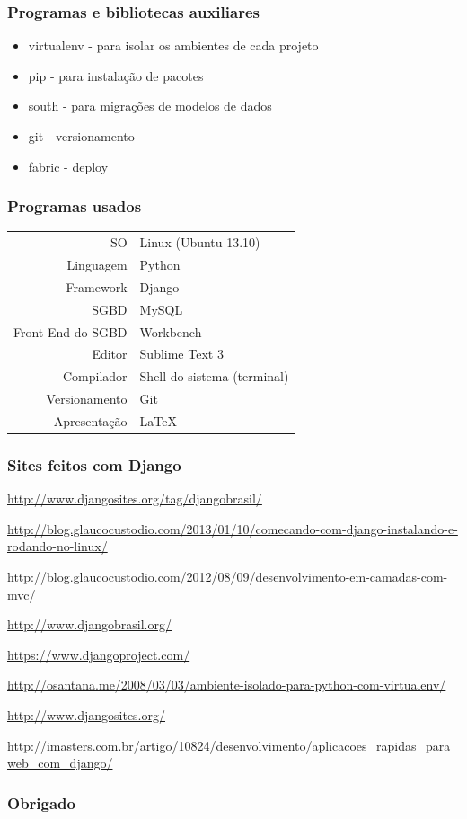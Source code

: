 \documentclass[aspectratio=169]{beamer}
\begin{document}
\begin{frame}\frametitle{Programas e bibliotecas auxiliares}
\begin{itemize}
	\item virtualenv - para isolar os ambientes de cada projeto
	\item pip - para instala\c c\~ao de pacotes
	\item south - para migra\c c\~oes de modelos de dados
	\item git - versionamento
	\item fabric - deploy
\end{itemize}
\end{frame}

\begin{frame}\frametitle{Programas usados}
	\begin{center}
      \begin{tabular}{r|l}
		SO & Linux (Ubuntu 13.10) \\
		Linguagem & Python \\
		Framework & Django \\
		SGBD & MySQL \\
		Front-End do SGBD & Workbench \\
		Editor & Sublime Text 3 \\
		Compilador & Shell do sistema (terminal) \\
		Versionamento & Git \\
		Apresenta\c c\~ao & LaTeX \\
      \end{tabular}
    \end{center}
\end{frame}


\begin{frame}\frametitle{Sites feitos com Django}
	\url{http://www.djangosites.org/tag/djangobrasil/}
	
	\url{http://blog.glaucocustodio.com/2013/01/10/comecando-com-django-instalando-e-rodando-no-linux/}
	
	\url{http://blog.glaucocustodio.com/2012/08/09/desenvolvimento-em-camadas-com-mvc/}
	
	\url{http://www.djangobrasil.org/}
	
	\url{https://www.djangoproject.com/}
	
	\url{http://osantana.me/2008/03/03/ambiente-isolado-para-python-com-virtualenv/}
	
	\url{http://www.djangosites.org/}
	
	\url{http://imasters.com.br/artigo/10824/desenvolvimento/aplicacoes\_rapidas\_para\_web\_com\_django/}
\end{frame}

\begin{frame}\frametitle{Obrigado}
\end{frame}
\end{document}
